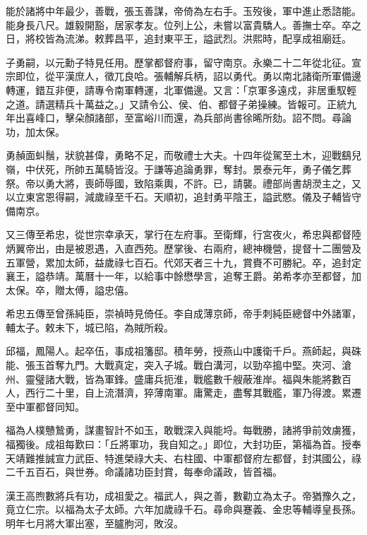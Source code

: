 \begin{pinyinscope}
能於諸將中年最少，善戰，張玉善謀，帝倚為左右手。玉歿後，軍中進止悉諮能。能身長八尺。雄毅開豁，居家孝友。位列上公，未嘗以富貴驕人。善撫士卒。卒之日，將校皆為流涕。敕葬昌平，追封東平王，謚武烈。洪熙時，配享成祖廟廷。

子勇嗣，以元勳子特見任用。歷掌都督府事，留守南京。永樂二十二年從北征。宣宗即位，從平漢庶人，徵兀良哈。張輔解兵柄，詔以勇代。勇以南北諸衛所軍備邊轉運，錯互非便，請專令南軍轉運，北軍備邊。又言：「京軍多遠戍，非居重馭輕之道。請選精兵十萬益之。」又請令公、侯、伯、都督子弟操練。皆報可。正統九年出喜峰口，擊朵顏諸部，至富峪川而還，為兵部尚書徐晞所劾。詔不問。尋論功，加太保。

勇赬面虯鬚，狀貌甚偉，勇略不足，而敬禮士大夫。十四年從駕至土木，迎戰鷂兒嶺，中伏死，所帥五萬騎皆沒。于謙等追論勇罪，奪封。景泰元年，勇子儀乞葬祭。帝以勇大將，喪師辱國，致陷乘輿，不許。已，請襲。禮部尚書胡濙主之，又以立東宮恩得嗣，減歲祿至千石。天順初，追封勇平陰王，謚武愍。儀及子輔皆守備南京。

又三傳至希忠，從世宗幸承天，掌行在左府事。至衛輝，行宮夜火，希忠與都督陸炳翼帝出，由是被恩遇，入直西苑。歷掌後、右兩府，總神機營，提督十二團營及五軍營，累加太師，益歲祿七百石。代郊天者三十九，賞賚不可勝紀。卒，追封定襄王，謚恭靖。萬曆十一年，以給事中餘懋學言，追奪王爵。弟希孝亦至都督，加太保。卒，贈太傅，謚忠僖。

希忠五傳至曾孫純臣，崇禎時見倚任。李自成薄京師，帝手刺純臣總督中外諸軍，輔太子。敕未下，城已陷，為賊所殺。

邱福，鳳陽人。起卒伍，事成祖籓邸。積年勞，授燕山中護衛千戶。燕師起，與硃能、張玉首奪九門。大戰真定，突入子城。戰白溝河，以勁卒搗中堅。夾河、滄州、靈璧諸大戰，皆為軍鋒。盛庸兵扼淮，戰艦數千艘蔽淮岸。福與朱能將數百人，西行二十里，自上流潛濟，猝薄南軍。庸驚走，盡奪其戰艦，軍乃得渡。累遷至中軍都督同知。

福為人樸戇鷙勇，謀畫智計不如玉，敢戰深入與能埒。每戰勝，諸將爭前效虜獲，福獨後。成祖每歎曰：「丘將軍功，我自知之。」即位，大封功臣，第福為首。授奉天靖難推誠宣力武臣、特進榮祿大夫、右柱國、中軍都督府左都督，封淇國公，祿二千五百石，與世券。命議諸功臣封賞，每奉命議政，皆首福。

漢王高煦數將兵有功，成祖愛之。福武人，與之善，數勸立為太子。帝猶豫久之，竟立仁宗。以福為太子太師。六年加歲祿千石。尋命與蹇義、金忠等輔導皇長孫。明年七月將大軍出塞，至臚朐河，敗沒。


\end{pinyinscope}
